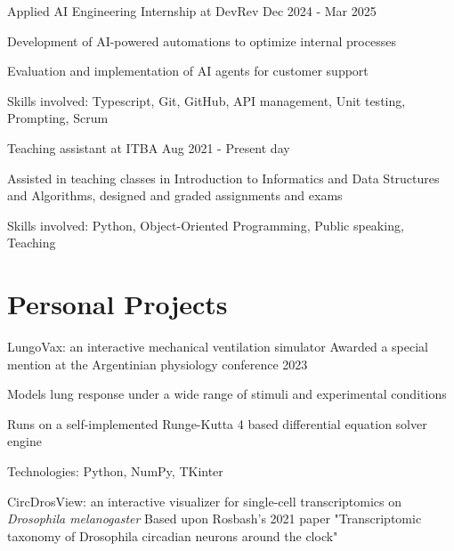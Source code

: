 \documentclass{resume}
\begin{document}
    \resumeSubheading
    {Applied AI Engineering Internship at DevRev}
    {}{}{Dec 2024 - Mar 2025}
    \vspace{-5mm}
    \resumeItemListStart
    \item
    {Development of AI-powered automations to optimize internal processes}
    \item {Evaluation and implementation of AI agents for customer support}
    \item {Skills involved: Typescript, Git, GitHub, API management, Unit testing, Prompting, Scrum}
    \resumeItemListEnd

    \resumeSubheading
    {Teaching assistant at ITBA}{}
    {}{Aug 2021 - Present day}
    \vspace{-5mm}
    \resumeItemListStart
    \item
    {Assisted in teaching classes in Introduction to Informatics and Data Structures and Algorithms,
        designed and graded assignments and exams}
    \item {Skills involved: Python, Object-Oriented Programming, Public speaking, Teaching}
    \resumeItemListEnd
    \resumeSubHeadingListEnd

    \vspace{-5mm}


    \section{\textbf{Personal Projects}} \label{sec:projects}
    \resumeSubHeadingListStart
    \resumeProject
    {LungoVax: an interactive mechanical ventilation simulator} %
    {Awarded a special mention at the Argentinian physiology conference 2023} %
    {} %

    \resumeItemListStart
    \item {Models lung response under a wide range of stimuli and experimental conditions}
    \item {Runs on a self-implemented Runge-Kutta 4 based differential equation solver engine}
    \item {Technologies: Python, NumPy, TKinter}
    \resumeItemListEnd

    \resumeProject
    {CircDrosView: an interactive visualizer for single-cell transcriptomics on \textit{Drosophila melanogaster}}
    {Based upon Rosbash's 2021 paper
    "Transcriptomic taxonomy of Drosophila circadian neurons around the clock"}
    {} %
\end{document}
